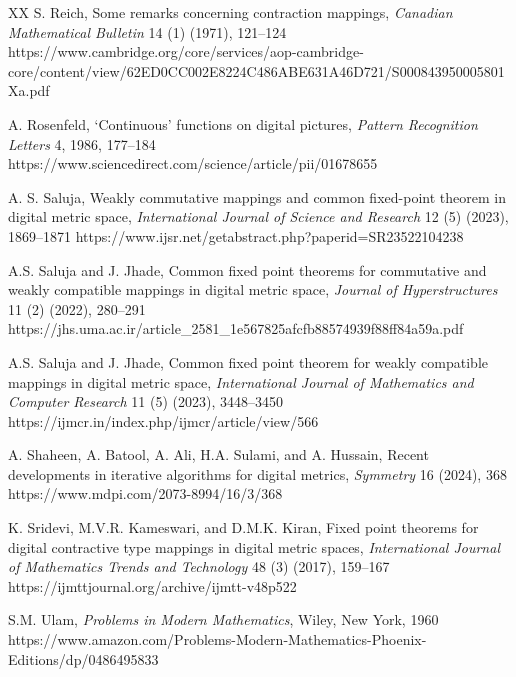 \documentclass{article}
\numberwithin{thm}{section}
\begin{document}
\begin{thebibliography}{XX}
S. Reich,
Some remarks concerning
contraction mappings,
{\em Canadian Mathematical Bulletin}
14 (1) (1971), 121--124
\newline
https://www.cambridge.org/core/services/aop-cambridge-core/content/view/62ED0CC002E8224C486ABE631A46D721/S000843950005801Xa.pdf

A. Rosenfeld, `Continuous' functions on digital pictures, 
{\em Pattern Recognition Letters} 4, 1986, 177--184
\newline
https://www.sciencedirect.com/science/article/pii/01678655

A. S. Saluja,
Weakly commutative mappings and common fixed-point theorem in digital metric space,
{\em International Journal of Science and Research} 12 (5) (2023),
1869--1871
\newline
https://www.ijsr.net/getabstract.php?paperid=SR23522104238

A.S. Saluja and J. Jhade,
Common fixed point theorems for commutative and weakly 
compatible mappings in digital metric space,
{\em Journal of Hyperstructures} 11 (2) (2022), 280--291
\newline
https://jhs.uma.ac.ir/article\_2581\_1e567825afcfb88574939f88ff84a59a.pdf

A.S. Saluja and J. Jhade,
Common fixed point theorem for 
weakly compatible mappings in digital
metric space,
{\em International Journal of 
Mathematics and Computer Research}
11 (5) (2023), 
3448--3450
\newline
https://ijmcr.in/index.php/ijmcr/article/view/566

A. Shaheen, A. Batool, A. Ali,
H.A. Sulami, and A. Hussain,
Recent developments in
iterative algorithms for
digital metrics,
{\em Symmetry} 16 (2024), 368 
\newline
https://www.mdpi.com/2073-8994/16/3/368

K. Sridevi, M.V.R. Kameswari, and D.M.K. Kiran,
Fixed point theorems for
digital contractive type
mappings in digital metric
spaces, 
{\em International Journal of Mathematics Trends and Technology} 
48 (3) (2017), 159--167
\newline
https://ijmttjournal.org/archive/ijmtt-v48p522

S.M. Ulam,
{\em Problems in Modern Mathematics},
Wiley, New York, 1960
\newline
https://www.amazon.com/Problems-Modern-Mathematics-Phoenix-Editions/dp/0486495833

\end{thebibliography}
\end{document}
